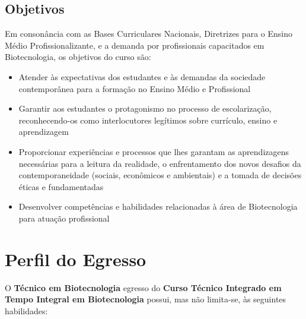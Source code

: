 \documentclass[11pt,fleqn]{book} %
\begin{document}
\subsection{Objetivos}
Em consonância com as Bases Curriculares Nacionais, Diretrizes para o Ensino Médio Profissionalizante, e a demanda por profissionais capacitados em Biotecnologia, os objetivos do curso são:
\begin{itemize}
\item Atender às expectativas dos estudantes e às demandas da sociedade contemporânea para a formação no Ensino Médio e Profissional
\item Garantir aos estudantes o protagonismo no processo de escolarização, reconhecendo-os como interlocutores legítimos sobre currículo, ensino e aprendizagem
\item Proporcionar experiências e processos que lhes garantam as aprendizagens necessárias para a leitura da realidade, o enfrentamento dos novos desafios da contemporaneidade (sociais, econômicos e ambientais) e a tomada de decisões éticas e fundamentadas
\item Desenvolver competências e habilidades relacionadas à área de Biotecnologia para atuação profissional
\end{itemize}

%


\section{Perfil do Egresso}\label{Perfil}
\indent

O \textbf{Técnico em Biotecnologia} egresso do \textbf{Curso Técnico Integrado em Tempo Integral em Biotecnologia} possui, mas não limita-se, às seguintes habilidades:
\end{document}
